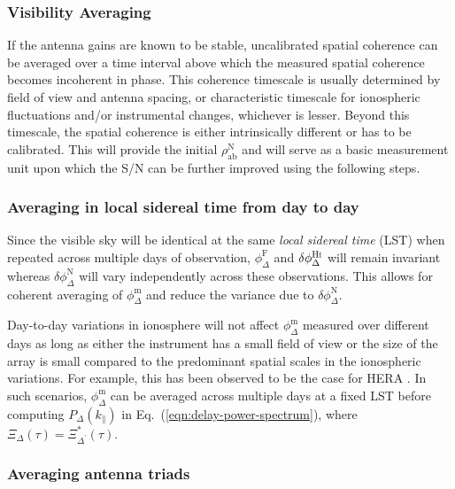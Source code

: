 \documentclass[
reprint,
superscriptaddress,
amsmath,
amssymb,
aps,
prd
]{revtex4-1}
\begin{document}
\subsubsection{Visibility Averaging}\label{sec:vis-avg}

If the antenna gains are known to be stable, uncalibrated spatial coherence can be averaged over a time interval above which the measured spatial coherence becomes incoherent in phase. This coherence timescale is usually determined by field of view and antenna spacing, or characteristic timescale for ionospheric fluctuations and/or instrumental changes, whichever is lesser. Beyond this timescale, the spatial coherence is either intrinsically different or has to be calibrated. This will provide the initial $\rho_\textrm{ab}^\textrm{N}$ and will serve as a basic measurement unit upon which the S/N can be further improved using the following steps. 

\subsubsection{Averaging in local sidereal time from day to day}\label{sec:lst-avg}

Since the visible sky will be identical at the same {\it local sidereal time} (LST) when repeated across multiple days of observation, $\phi_\Delta^\textrm{F}$ and $\delta\phi_\Delta^\textrm{H{\sc i}}$ will remain invariant whereas $\delta\phi_\Delta^\textrm{N}$ will vary independently across these observations. This allows for coherent averaging of $\phi_\Delta^\textrm{m}$ and reduce the variance due to $\delta\phi_\Delta^\textrm{N}$.

Day-to-day variations in ionosphere will not affect $\phi_\Delta^\textrm{m}$ measured over different days as long as either the instrument has a small field of view or the size of the array is small compared to the predominant spatial scales in the ionospheric variations. For example, this has been observed to be the case for HERA \cite{car18}. In such scenarios, $\phi_\Delta^\textrm{m}$ can be averaged across multiple days at a fixed LST before computing $P_\Delta(k_\parallel)$ in Eq.~(\ref{eqn:delay-power-spectrum}), where $\Xi_\Delta(\tau)=\Xi_{\Delta^\prime}^*(\tau)$. 

\subsubsection{Averaging antenna triads}\label{sec:triad-avg}
\end{document}
